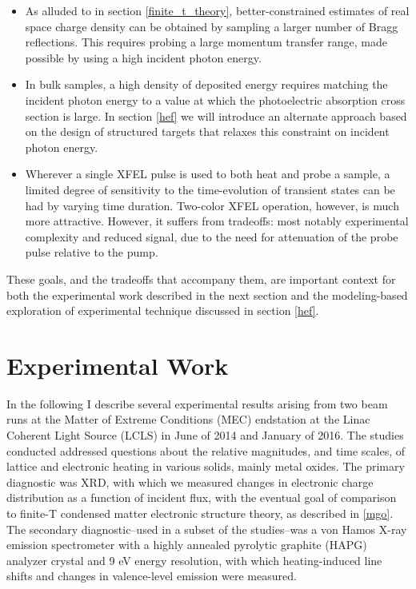 \documentclass [11pt, proquest, article] {uwthesis}[2016/11/22]
\begin{document}
\begin{itemize}
\item{As alluded to in section \ref{finite_t_theory}, better-constrained estimates of real space charge density can be obtained by sampling a larger number of Bragg reflections. This requires probing a large momentum transfer range, made possible by using a high incident photon energy.}
\item{In bulk samples, a high density of deposited energy requires matching the incident photon energy to a value at which the photoelectric absorption cross section is large. In section \ref{hef} we will introduce an alternate approach based on the design of structured targets that relaxes this constraint on incident photon energy.}
\item{Wherever a single XFEL pulse is used to both heat and probe a sample, a limited degree of sensitivity to the time-evolution of transient states can be had by varying time duration. Two-color XFEL operation, however, is much more attractive. However, it suffers from tradeoffs: most notably experimental complexity and reduced signal, due to the need for attenuation of the probe pulse relative to the pump. }
\end{itemize}
These goals, and the tradeoffs that accompany them, are important context for both the experimental work described in the next section and the modeling-based exploration of experimental technique discussed in section \ref{hef}.

\section{Experimental Work}
In the following I describe several experimental results arising from two beam runs at the Matter of Extreme Conditions (MEC) endstation at the Linac Coherent Light Source (LCLS) in June of 2014 and January of 2016. The studies conducted addressed questions about the relative magnitudes, and time scales, of lattice and electronic heating in various solids, mainly metal oxides. The primary diagnostic was XRD, with which we measured changes in electronic charge distribution as a function of incident flux, with the eventual goal of comparison to finite-T condensed matter electronic structure theory, as described in \ref{mgo}. The secondary diagnostic--used in a subset of the studies--was a von Hamos X-ray emission spectrometer with a highly annealed pyrolytic graphite (HAPG) analyzer crystal and 9 eV energy resolution, with which heating-induced line shifts and changes in valence-level emission were measured. 
\end{document}
